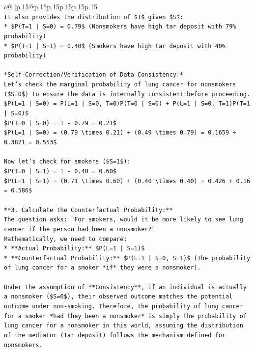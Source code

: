 \documentclass{article}
\begin{document}
{\begin{supertabular}{c@{$\;$}|p{.15\linewidth}@{}p{.15\linewidth}p{.15\linewidth}p{.15\linewidth}p{.15\linewidth}p{.15\linewidth}}
{{{\\ 
\texttt{It also provides the distribution of \$T\$ given \$S\$:} \\
\texttt{*   \$P(T=1 | S=0) = 0.79\$ (Nonsmokers have high tar deposit with 79\% probability)} \\
\texttt{*   \$P(T=1 | S=1) = 0.40\$ (Smokers have high tar deposit with 40\% probability)} \\
\\ 
\texttt{*Self{-}Correction/Verification of Data Consistency:*} \\
\texttt{Let's check the marginal probability of lung cancer for nonsmokers (\$S=0\$) to ensure the data is internally consistent before proceeding.} \\
\texttt{\$P(L=1 | S=0) = P(L=1 | S=0, T=0)P(T=0 | S=0) + P(L=1 | S=0, T=1)P(T=1 | S=0)\$} \\
\texttt{\$P(T=0 | S=0) = 1 {-} 0.79 = 0.21\$} \\
\texttt{\$P(L=1 | S=0) = (0.79 \textbackslash{}times 0.21) + (0.49 \textbackslash{}times 0.79) = 0.1659 + 0.3871 = 0.553\$} \\
\\ 
\texttt{Now let's check for smokers (\$S=1\$):} \\
\texttt{\$P(T=0 | S=1) = 1 {-} 0.40 = 0.60\$} \\
\texttt{\$P(L=1 | S=1) = (0.71 \textbackslash{}times 0.60) + (0.40 \textbackslash{}times 0.40) = 0.426 + 0.16 = 0.586\$} \\
\\ 
\texttt{**3. Calculate the Counterfactual Probability:**} \\
\texttt{The question asks: "For smokers, would it be more likely to see lung cancer if the person had been a nonsmoker?"} \\
\texttt{Mathematically, we need to compare:} \\
\texttt{*   **Actual Probability:** \$P(L=1 | S=1)\$} \\
\texttt{*   **Counterfactual Probability:** \$P(L=1 | S=0, S=1)\$ (The probability of lung cancer for a smoker *if* they were a nonsmoker).} \\
\\ 
\texttt{Under the assumption of **Consistency**, if an individual is actually a nonsmoker (\$S=0\$), their observed outcome matches the potential outcome under non{-}smoking. Therefore, the probability of lung cancer for a smoker *had they been a nonsmoker* is simply the probability of lung cancer for a nonsmoker in this world, assuming the distribution of the mediator (Tar deposit) follows the mechanism defined for nonsmokers.} \\
}}}
\end{supertabular}}
\end{document}

